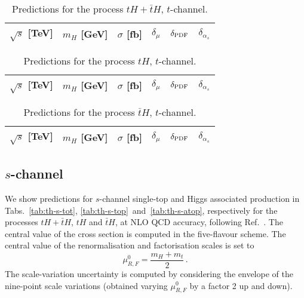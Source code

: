 \documentclass[a4paper,usenames,dvipsnames,11pt]{article}
\begin{document}
\begin{table}
    \centering
    \begin{tabular}{cccccc}
        $\sqrt{s}$ [TeV]  &  $m_H$ [GeV]  &  $\sigma$ [fb]  & $\delta_{\mu}$   &  $\delta_{\rm PDF}$   & $\delta_{\alpha_s}$\\
        \hline
          
    \end{tabular}
    \caption{\label{tab:th-t-tot} Predictions for the process $tH + \bar t H$, $t$-channel.}
\end{table}
%
\begin{table}
    \centering
    \begin{tabular}{cccccc}
        $\sqrt{s}$ [TeV]  &  $m_H$ [GeV]  &  $\sigma$ [fb]  & $\delta_{\mu}$   &  $\delta_{\rm PDF}$   & $\delta_{\alpha_s}$\\
        \hline
          
    \end{tabular}
    \caption{\label{tab:th-t-top} Predictions for the process $tH$, $t$-channel.}
\end{table}
%
\begin{table}
    \centering
    \begin{tabular}{cccccc}
        $\sqrt{s}$ [TeV]  &  $m_H$ [GeV]  &  $\sigma$ [fb]  & $\delta_{\mu}$   &  $\delta_{\rm PDF}$   & $\delta_{\alpha_s}$\\
        \hline
          
    \end{tabular}
    \caption{\label{tab:th-t-atop} Predictions for the process $\bar tH$, $t$-channel.}
\end{table}


\subsection{$s$-channel}
We show predictions for $s$-channel single-top and Higgs associated production in Tabs.~\ref{tab:th-s-tot}, \ref{tab:th-s-top}~and~\ref{tab:th-s-atop},
respectively for the processes $tH + \bar t H$, $tH$ and $\bar t H$, at NLO QCD accuracy, following Ref.~\cite{Demartin:2015uha}. The central 
value of the cross section is computed in the five-flavour scheme. 
The central value of the renormalisation and factorisation scales is set to
\begin{equation}
    \mu_{R,F}^0 = \frac{m_H+m_t}{2}\,.
\end{equation}
The scale-variation uncertainty is computed by considering the envelope of the 
nine-point scale variations (obtained varying $ \mu_{R,F}^0$ by a factor 2 up and down).
\end{document}
